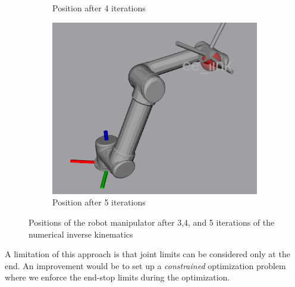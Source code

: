 \documentclass[11pt]{article}
\begin{document}
\begin{figure}[H]
\begin{subfigure}[b]{0.3\textwidth}
		\caption{Position after 4 iterations}
		\label{fig:4it}
	\end{subfigure}
	\begin{subfigure}[b]{0.3\textwidth}
		\centering
		\includegraphics[height=\textwidth]{pics/5iters.png}
		\caption{Position after 5 iterations}
		\label{fig:5it}			
	\end{subfigure}
	\caption{Positions of the robot manipulator after 3,4, and 5 iterations of the numerical inverse kinematics}
	\label{fig:ik}
\end{figure}

A limitation of this approach is that joint limits can be considered only at the end. An improvement would be to set up a \textit{constrained} optimization problem where we enforce the end-stop limits during the optimization.\\
\end{document}
